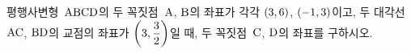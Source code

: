 평행사변형~$\mathrm{ABCD}$의 두 꼭짓점~$\mathrm{A}$, $\mathrm{B}$의 좌표가 각각 $(3{,}\mkern3mu\mathopen{}6)$, $(-1{,}\mkern3mu\mathopen{}3)$이고, 두 대각선~$\mathrm{AC}$, $\mathrm{BD}$의 교점의 좌표가 $\left(3{,}\mkern3mu\mathopen{}\dfrac{3}{2}\right)$일 때, 두 꼭짓점~$\mathrm{C}$, $\mathrm{D}$의 좌표를 구하시오.
